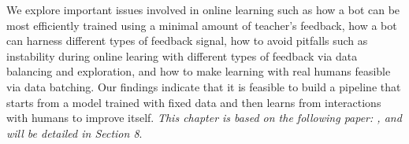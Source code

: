     We explore  important issues involved in online learning
   such as  how a bot can be most efficiently trained using a minimal amount of teacher's feedback,
 how a bot can harness different types of feedback signal,
how to avoid pitfalls such as instability during online learing with different types of feedback via
 data balancing and exploration,
and how to make learning with real humans feasible via data batching.
Our findings indicate that
it is feasible to build a pipeline
that starts from a model trained with fixed data and then learns from interactions with humans
to improve itself. 
{\it This chapter is based on the following paper: , and will be detailed in Section 8}. 

 

